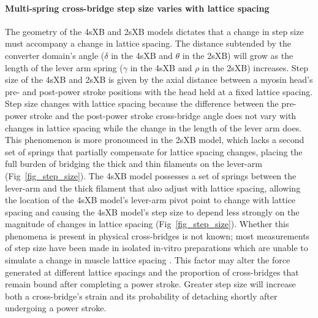 \documentclass[10pt]{article}
\newcommand{\citep}[1]{\cite{#1}} %
\begin{document}
\paragraph{Multi-spring cross-bridge step size varies with lattice spacing} %
The geometry of the 4sXB and 2sXB models dictates that a change in step size must accompany a change in lattice spacing. 
The distance subtended by the converter domain's angle ($\delta$ in the 4sXB and $\theta$ in the 2sXB) will grow as the length of the lever arm spring ($\gamma$ in the 4sXB and $\rho$ in the 2sXB) increases. 
Step size of the 4sXB and 2sXB is given by the axial distance between a myosin head's pre- and post-power stroke positions with the head held at a fixed lattice spacing. 
Step size changes with lattice spacing because the difference between the pre-power stroke and the post-power stroke cross-bridge angle does not vary with changes in lattice spacing while the change in the length of the lever arm does. 
This phenomenon is more pronounced in the 2sXB model, which lacks a second set of springs that partially compensate for lattice spacing changes, placing the full burden of bridging the thick and thin filaments on the lever-arm (Fig~\ref{fig_step_size}). 
The 4sXB model possesses a set of springs between the lever-arm and the thick filament that also adjust with lattice spacing, allowing the location of the 4sXB model's lever-arm pivot point to change with lattice spacing and causing the 4sXB model's step size to depend less strongly on the magnitude of changes in lattice spacing (Fig~\ref{fig_step_size}).  
Whether this phenomena is present in physical cross-bridges is not known; most measurements of step size have been made in isolated in-vitro preparations which are unable to simulate a change in muscle lattice spacing \citep{HowardBook, Peterman2004}.  
This factor may alter the force generated at different lattice spacings and the proportion of cross-bridges that remain bound after completing a power stroke.
Greater step size will increase both a cross-bridge's strain and its probability of detaching shortly after undergoing a power stroke. 
\end{document}
